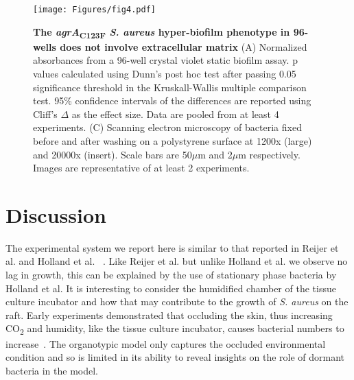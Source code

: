 \documentclass[10pt,letterpaper]{article}
\begin{document}
\begin{figure}[!ht]
\begin{adjustwidth}{-2.25in}{0in}
\texttt{[image: Figures/fig4.pdf]}
\caption[The \textit{agrA}\textsubscript{C123F} \textit{S. aureus} hyper-biofilm phenotype in 96-wells does not involve extracellular matrix]{
	\textbf{The \textit{agrA}\textsubscript{C123F} \textit{S. aureus} hyper-biofilm phenotype in 96-wells does not involve extracellular matrix}
	(A) Normalized absorbances from a 96-well crystal violet static biofilm assay. p values calculated using Dunn's post hoc test after passing 0.05 significance threshold in the Kruskall-Wallis multiple comparison test. 95\% confidence intervals of the differences are reported using Cliff's $\Delta$ as the effect size. Data are pooled from at least 4 experiments.
	(C) Scanning electron microscopy of bacteria fixed before and after washing on a polystyrene surface at 1200x (large) and 20000x (insert). Scale bars are 50$\mu$m and 2$\mu$m respectively. Images are representative of at least 2 experiments.}
    \label{fig4}
    \end{adjustwidth}
\end{figure}

\section*{Discussion}

The experimental system we report here is similar to that reported in Reijer et al. and Holland et al. ~\cite{reijer_detection_2016,holland_microbial_2008}.
Like Reijer et al. but unlike Holland et al. we observe no lag in growth, this can be explained by the use of stationary phase bacteria by Holland et al.
It is interesting to consider the humidified chamber of the tissue culture incubator and how that may contribute to the growth of \textit{S. aureus} on the raft.
Early experiments demonstrated that occluding the skin, thus increasing CO\textsubscript{2} and humidity, like the tissue culture incubator, causes bacterial numbers to increase~\cite{lovell_skin_1945-1}.
The organotypic model only captures the occluded environmental condition and so is limited in its ability to reveal insights on the role of dormant bacteria in the model.
\end{document}
